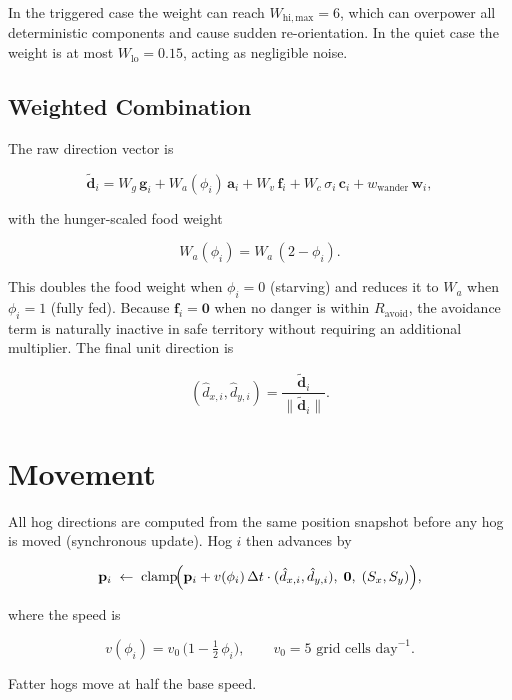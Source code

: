 \documentclass[11pt]{article}
\begin{document}
In the triggered case the weight can reach $W_{\mathrm{hi,max}} = 6$, which
can overpower all deterministic components and cause sudden re-orientation.
In the quiet case the weight is at most $W_{\mathrm{lo}} = 0.15$, acting as
negligible noise.

\subsection{Weighted Combination}
\label{sec:weights}

The raw direction vector is

\begin{equation}
\label{eq:direction}
  \tilde{\mathbf{d}}_i
    = W_g\,\mathbf{g}_i
    + W_a(\phi_i)\,\mathbf{a}_i
    + W_v\,\mathbf{f}_i
    + W_c\,\sigma_i\,\mathbf{c}_i
    + w_{\mathrm{wander}}\,\mathbf{w}_i,
\end{equation}

with the hunger-scaled food weight

\[
  W_a(\phi_i) = W_a\,(2 - \phi_i).
\]

This doubles the food weight when $\phi_i = 0$ (starving) and reduces it to
$W_a$ when $\phi_i = 1$ (fully fed).  Because $\mathbf{f}_i = \mathbf{0}$ when
no danger is within $R_{\mathrm{avoid}}$, the avoidance term is naturally
inactive in safe territory without requiring an additional multiplier.  The
final unit direction is

\[
  (\hat{d}_{x,i}, \hat{d}_{y,i}) = \frac{\tilde{\mathbf{d}}_i}{\|\tilde{\mathbf{d}}_i\|}.
\]

\section{Movement}

All hog directions are computed from the same position snapshot before any hog
is moved (synchronous update).  Hog $i$ then advances by

\[
  \mathbf{p}_i \;\leftarrow\;
    \mathrm{clamp}\!\Bigl(
      \mathbf{p}_i
      + v(\phi_i)\,\Delta t \cdot (\hat{d}_{x,i}, \hat{d}_{y,i}),
      \;\mathbf{0},\;(S_x, S_y)
    \Bigr),
\]

where the speed is

\[
  v(\phi_i) = v_0\,\bigl(1 - \tfrac{1}{2}\,\phi_i\bigr),
  \qquad v_0 = 5 \text{ grid cells day}^{-1}.
\]

Fatter hogs move at half the base speed.
\end{document}
